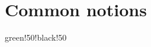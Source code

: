 \documentclass{book}
\begin{document}
\frontmatter



%
%
\listoffigures

\mainmatter

\chapter{Common notions}{green!50!black!50}







\end{document}
